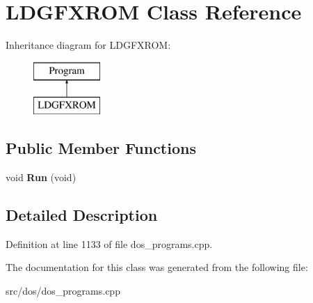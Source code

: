 \hypertarget{classLDGFXROM}{\section{L\-D\-G\-F\-X\-R\-O\-M Class Reference}
\label{classLDGFXROM}
}
Inheritance diagram for L\-D\-G\-F\-X\-R\-O\-M\-:\begin{figure}[H]
\begin{center}
\leavevmode
\includegraphics[height=2.000000cm]{classLDGFXROM}
\end{center}
\end{figure}
\subsection*{Public Member Functions}
\begin{DoxyCompactItemize}
\item 
\hypertarget{classLDGFXROM_aa4ee1bd38f082b0bb08d4fa9ed5f5626}{void {\bfseries Run} (void)}\label{classLDGFXROM_aa4ee1bd38f082b0bb08d4fa9ed5f5626}

\end{DoxyCompactItemize}


\subsection{Detailed Description}


Definition at line 1133 of file dos\-\_\-programs.\-cpp.



The documentation for this class was generated from the following file\-:\begin{DoxyCompactItemize}
\item 
src/dos/dos\-\_\-programs.\-cpp\end{DoxyCompactItemize}
